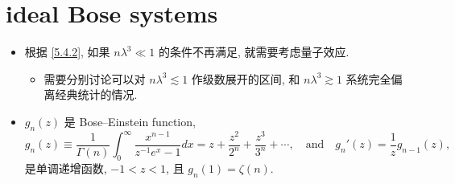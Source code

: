 \chapter{ideal Bose systems} \label{7}
\begin{itemize}
	\item 根据 \eqref{5.4.2}, 如果 $n \lambda^3 \ll 1$ 的条件不再满足, 就需要考虑量子效应.
	\begin{itemize}
		\item 需要分别讨论可以对 $n \lambda^3 \lesssim 1$ 作级数展开的区间, 和 $n \lambda^3 \gtrsim 1$ 系统完全偏离经典统计的情况.
	\end{itemize}
	
	\item $g_n(z)$ 是 Bose--Einstein function,
	\begin{equation}
		g_n(z) \equiv \frac{1}{\Gamma(n)} \int_0^\infty \frac{x^{n - 1}}{z^{- 1} e^x - 1} dx = z + \frac{z^2}{2^n} + \frac{z^3}{3^n} + \cdots, \quad \text{and} \quad g_n'(z) = \frac{1}{z} g_{n - 1}(z),
	\end{equation}
	是单调递增函数, $- 1 < z < 1$, 且 $g_n(1) = \zeta(n)$.
\end{itemize}

